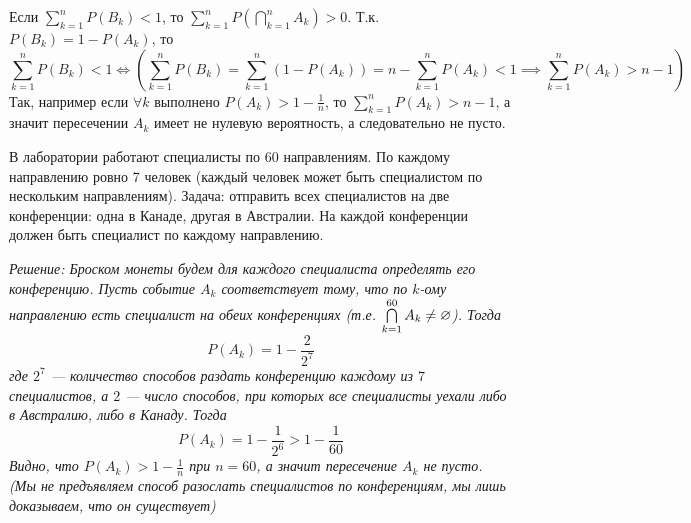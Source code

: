Если $\sum\limits_{k = 1}^{n} P(B_k) < 1$, то $\sum\limits_{k = 1}^{n} P\left( \bigcap\limits_{k = 1}^n A_k \right) > 0$.
Т.к. $P(B_k) = 1 - P(A_k)$, то
\[
    \sum\limits_{k = 1}^{n} P(B_k) < 1 \iff
    \left(\sum\limits_{k = 1}^{n} P(B_k) =
    \sum\limits_{k = 1}^{n} \left( 1 - P(A_k) \right) =
    n - \sum\limits_{k = 1}^{n} P(A_k) < 1
    \implies
    \sum\limits_{k = 1}^n P(A_k) > n - 1
    \right)
\]
Так, например если $\forall k$ выполнено $P(A_k) > 1 - \frac{1}{n}$, то $\sum\limits_{k = 1}^n P(A_k) > n - 1$, а значит
пересечении $A_k$ имеет не нулевую вероятность, а следовательно не пусто.
\begin{comment}
    \[
        P(\nothing) = 1 - P(\Omega) = 1 - 1 = 0
    \]
    С другой стороны
    \[
        P(\nothing) = \frac{|\nothing|}{|\Omega|} = \frac{0}{|\Omega|} = 0
    \]
\end{comment}
\begin{problem}
    В лаборатории работают специалисты по 60 направлениям. По каждому направлению ровно 7 человек (каждый человек может быть
    специалистом по нескольким направлениям). Задача: отправить всех специалистов на две конференции: одна в Канаде,
    другая в Австралии. На каждой конференции должен быть специалист по каждому направлению.

    \it{Решение:} Броском монеты будем для каждого специалиста определять его конференцию. Пусть событие $A_k$ соответствует
    тому, что по $k$-ому направлению есть специалист на обеих конференциях (т.е. $\bigcap\limits_{k = 1}^{60} A_k \neq \varnothing$).
    Тогда
    \[
        P(A_k) = 1 - \frac{2}{2^7}
    \]
    где $2^7$ --- количество способов раздать конференцию каждому из $7$ специалистов, а $2$ --- число способов, при которых
    все специалисты уехали либо в Австралию, либо в Канаду. Тогда
    \[
        P(A_k) = 1 - \frac{1}{2^6} > 1 - \frac{1}{60}
    \]
    Видно, что $P(A_k) > 1 - \frac{1}{n}$ при $n = 60$, а значит пересечение $A_k$ не пусто.
    (Мы не предъявляем способ разослать специалистов по конференциям, мы лишь доказываем, что он существует)
\end{problem}

